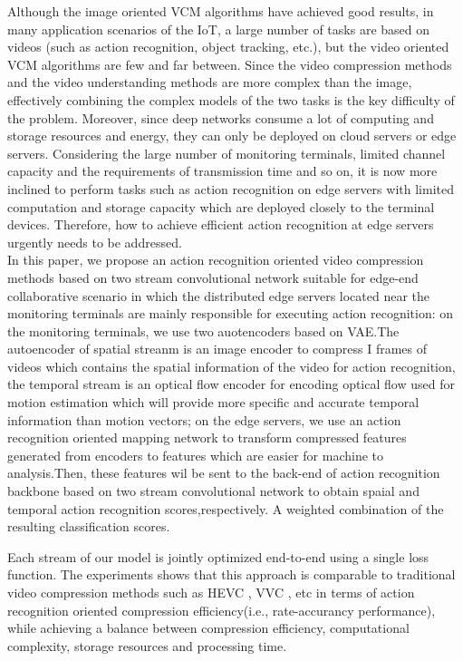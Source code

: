 \documentclass[a4paper]{cas-sc}
\begin{document}
Although the image oriented VCM algorithms have achieved good results, 
in many application scenarios of the IoT, 
a large number of tasks are based on videos (such as action recognition, object tracking, etc.), 
but the video oriented VCM algorithms are few and far between. 
Since the video compression methods and the video understanding methods are more complex than the image, 
effectively combining the complex models of the two tasks is the key difficulty of the problem. Moreover, 
since deep networks consume a lot of computing and storage resources and energy, 
they can only be deployed on cloud servers or edge servers. Considering the large number of monitoring terminals, 
limited channel capacity and the requirements of transmission time and so on, 
it is now more inclined to perform tasks such as action recognition on edge servers with limited computation and storage capacity
which are deployed closely to the terminal devices.
Therefore, how to achieve efficient action recognition at edge servers urgently needs to be addressed.\\

In this paper, 
we propose an action recognition oriented video compression methods based on two stream convolutional network \cite{simonyan2014two} suitable 
for edge-end collaborative scenario in which the distributed edge servers located near the monitoring terminals are 
mainly responsible for executing action recognition:
on the monitoring terminals, we use two auotencoders based on VAE.The autoencoder of spatial streanm is an image encoder 
to compress I frames of videos which contains the spatial information of the video for action recognition, 
the temporal stream is an optical flow encoder for encoding optical flow used for motion estimation which will provide more specific and accurate 
temporal information than motion vectors; 
on the edge servers, 
we use an action recognition oriented mapping network to transform compressed features generated from encoders to features which are easier
for machine to analysis.Then, these features wil be sent to the back-end of action recognition backbone based on two stream convolutional 
network to obtain spaial and temporal action recognition scores,respectively. 
A weighted combination of the resulting classification scores. 

Each stream of our model is jointly optimized end-to-end using a single loss function. 
The experiments shows that this approach is comparable to traditional video compression methods such as HEVC \cite{sullivan2012overview}, 
VVC \cite{bross2021overview}, etc in terms of 
action recognition oriented compression efficiency(i.e., rate-accurancy performance), while achieving a balance between compression efficiency, computational complexity,
storage resources and processing time.
\end{document}
